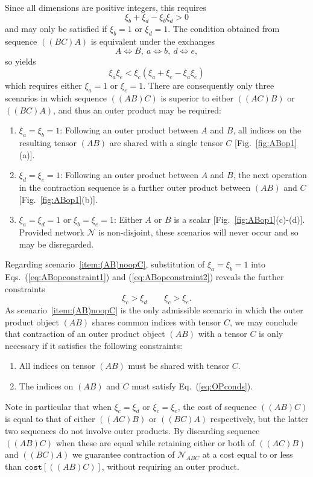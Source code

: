 \documentclass[aps,pre,reprint,superscriptaddress,amsfonts,amsmath,showpacs,nofootinbib,floatfix]{revtex4-1}
\newcommand{\mc}[1]{\mathcal{#1}}
\newcommand{\Eref}[1]{Eq.~(\ref{#1})}
\newcommand{\Erefs}[2]{Eqs.~(\ref{#1}) and (\ref{#2})}
\newcommand{\fref}[1]{Fig.~\ref{#1}}
\newcommand{\scref}[1]{scenario~\ref{#1}}
\newcommand{\ttt}[1]{\texttt{#1}}
\newcommand{\xa}{\xi_a}
\newcommand{\xb}{\xi_b}
\newcommand{\xc}{\xi_c}
\newcommand{\xd}{\xi_d}
\newcommand{\xe}{\xi_e}
\begin{document}
Since all dimensions are positive integers, this requires 
\begin{equation}
\xb+\xd-\xb\xd>0
\end{equation}
and may only be satisfied if $\xb=1$ or $\xd=1$. The condition obtained from sequence $((BC)A)$ is equivalent under the exchanges 
\begin{equation}
A\Leftrightarrow B,~a\Leftrightarrow b,~d\Leftrightarrow e, 
\end{equation}
so yields 
\begin{equation}
\xa\xe<\xc(\xa+\xe-\xa\xe)\label{eq:ABopconstraint2}
\end{equation}
which requires either $\xa=1$ or $\xe=1$. There are consequently only three scenarios in which sequence $((AB)C)$ is superior to either $((AC)B)$ or $((BC)A)$, and thus an outer product may be required:
\begin{enumerate}
\item $\xa=\xb=1$: Following an outer product between $A$ and $B$, all indices on the resulting tensor $(AB)$ are shared with a single tensor $C$ [\fref{fig:ABop1}(a)].\label{item:(AB)noopC}
\item $\xd=\xe=1$: Following an outer product between $A$ and $B$, the next operation in the contraction sequence is a further outer product between $(AB)$ and $C$ [\fref{fig:ABop1}(b)]. 
\label{item:(AB)opC}
\item $\xa=\xd=1$ or $\xb=\xe=1$: Either $A$ or $B$ is a scalar [\fref{fig:ABop1}(c)-(d)]. Provided network $\mc{N}$ is non-disjoint, these scenarios will never occur and so may be disregarded.\label{item:scenario3}
\end{enumerate}

Regarding \scref{item:(AB)noopC}, substitution of $\xa=\xb=1$ into \Erefs{eq:ABopconstraint1}{eq:ABopconstraint2} reveals the further constraints 
\begin{equation}
\xc>\xd\qquad\xc>\xe.\label{eq:OPconds} 
\end{equation}
As \scref{item:(AB)noopC} is the only admissible scenario in which the outer product object $(AB)$ shares common indices with tensor $C$, we may conclude that contraction of an outer product object $(AB)$ with a tensor $C$ is only necessary if it satisfies the following constraints:
\begin{enumerate}
\item All indices on tensor $(AB)$ must be shared with tensor $C$.
\item The indices on $(AB)$ and $C$ must satisfy \Eref{eq:OPconds}.
\end{enumerate}
Note in particular that when $\xc=\xd$ or $\xc=\xe$, the cost of sequence $((AB)C)$ is equal to that of either $((AC)B)$ or $((BC)A)$ respectively, but the latter two sequences do not involve outer products. By discarding sequence $((AB)C)$ when these are equal while retaining either or both of $((AC)B)$ and $((BC)A)$ we guarantee contraction of $\mc{N}_{ABC}$ at a cost equal to or less than $\ttt{cost}[((AB)C)]$, without requiring an outer product.
\end{document}
